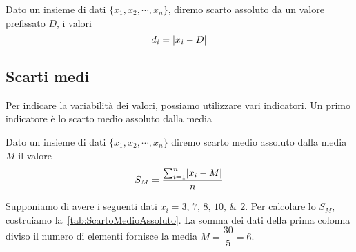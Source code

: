 \begin{defn}
Dato un insieme di dati  $\lbrace x_{1},x_{2},\cdots,x_{n}\rbrace$, diremo scarto assoluto da un valore prefissato $D$,  i valori \[d_{i}= \abs{x_{i}-D }\]
\end{defn}
\subsection{Scarti medi}
Per indicare la variabilità dei valori,  possiamo utilizzare vari indicatori. Un primo indicatore è lo scarto medio assoluto dalla media
\begin{defn}
Dato un insieme di dati  $\lbrace x_{1},x_{2},\cdots,x_{n}\rbrace$ diremo scarto medio assoluto dalla media $M$  il valore \[ S_{M}=\dfrac{\sum_{i=1}^{n}\abs{x_{i}-M}}{n}\]
\end{defn}
Supponiamo di avere i seguenti dati $x_{i}=\numlist{3;7;8;10;2}$. Per calcolare lo $S_{M}$, costruiamo la~\vref{tab:ScartoMedioAssoluto}. La somma dei dati della prima colonna diviso il numero di elementi fornisce la media $M=\dfrac{30}{5}=6$.  

